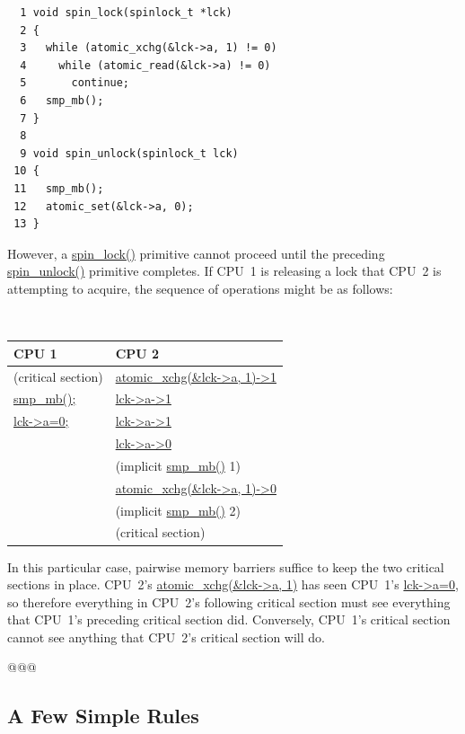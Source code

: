 \vspace{5pt}
\begin{minipage}[t]{\columnwidth}
\begin{verbatim}
  1 void spin_lock(spinlock_t *lck)
  2 {
  3   while (atomic_xchg(&lck->a, 1) != 0)
  4     while (atomic_read(&lck->a) != 0)
  5       continue;
  6   smp_mb();
  7 }
  8
  9 void spin_unlock(spinlock_t lck)
 10 {
 11   smp_mb();
 12   atomic_set(&lck->a, 0);
 13 }
\end{verbatim}
\end{minipage}
\label{codesample:advsync:Naive Lock and Unlock Pseudocode}
\vspace{5pt}

However, a \url{spin_lock()} primitive cannot proceed until
the preceding \url{spin_unlock()} primitive completes.
If CPU~1 is releasing a lock that CPU~2 is attempting to acquire,
the sequence of operations might be as follows:

\vspace{5pt}
\begin{minipage}[t]{\columnwidth}
\tt \scriptsize
\begin{tabular}{l|l}
	CPU 1 &			CPU 2 \\
	\hline
	(critical section) &	\url{atomic_xchg(&lck->a, 1)->1} \\
	\url{smp_mb();} &	\url{lck->a->1} \\
	\url{lck->a=0;} &	\url{lck->a->1} \\
	&			\url{lck->a->0} \\
	&			(implicit \url{smp_mb()} 1) \\
	&			\url{atomic_xchg(&lck->a, 1)->0} \\
	&			(implicit \url{smp_mb()} 2) \\
	&			(critical section) \\
\end{tabular}
\end{minipage}
\vspace{5pt}

In this particular case, pairwise memory barriers suffice to keep
the two critical sections in place.
CPU~2's \url{atomic_xchg(&lck->a, 1)} has seen CPU~1's \url{lck->a=0},
so therefore everything in CPU~2's following critical section must see
everything that CPU~1's preceding critical section did.
Conversely, CPU~1's critical section cannot see anything that CPU~2's
critical section will do.

@@@

\subsection{A Few Simple Rules}
\label{sec:advsync:A Few Simple Rules}

